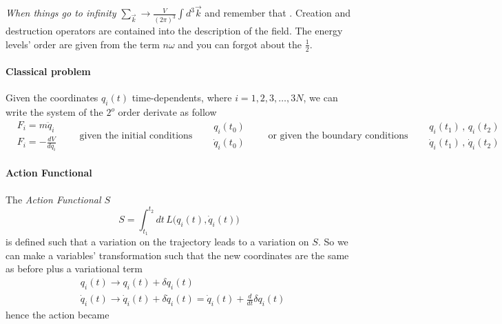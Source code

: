 \documentclass[class=article]{standalone}
\begin{document}
\emph{When things go to infinity} $\sum_{\vec k}  \rightarrow \frac{V}{(2\pi)^3} \int d^3 \vec k$ and remember that .
Creation and destruction operators are contained into the description of the field.
The energy levels' order are given from the term $ n \omega$ and you can forgot about the $\frac{1}{2}$.

\paragraph{Classical problem} Given the coordinates $q_i(t)$ time-dependents, where $i = 1, 2, 3, \ldots, 3N$, we can write the system of the $2^o$ order derivate as follow
\begin{equation*}
\begin{split}
& F_i = m \ddot q_i \\
& F_i = - \frac{d V}{d q_i}
\end{split}
\quad\quad \mbox{given the initial conditions}\quad
\begin{split}
& q_i(t_0) \\
& \dot q_i(t_0) 
\end{split}
\quad\quad \mbox{or given the boundary conditions}\quad
\begin{split}
& q_i(t_1) \,,\, q_i(t_2)   \\
& \dot q_i(t_1) \,,\, \dot q_i(t_2)  
\end{split}
\end{equation*}

\paragraph{Action Functional} The \emph{Action Functional $S$} 
\begin{equation*}
S = \int_{t_1}^{t_2} dt \, L \Big( q_i(t),\dot q_i(t) \Big)
\end{equation*}
is defined such that a variation on the trajectory leads to a variation on $S$.
So we can make a variables' transformation such that the new coordinates are the same as before plus a variational term
\begin{equation*}
\begin{split}
& q_i(t) \rightarrow q_i(t) + \delta q_i(t) \\
& \dot q_i(t) \rightarrow \dot q_i(t) + \delta \dot q_i(t) =  \dot q_i(t) + \frac{d}{dt} \delta q_i(t)
\end{split}
\end{equation*}
hence the action became
\end{document}
